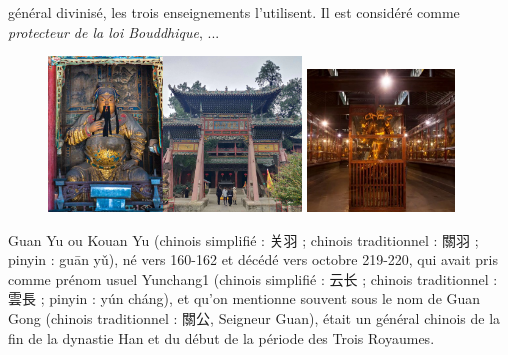 \begin{Ex}[Guan Yu ]
général divinisé, les trois enseignements l'utilisent. Il est considéré comme \textit{protecteur de la loi Bouddhique}, ...
        \begin{figure}[!h]
        \centering
                \includegraphics[width=0.6\textwidth]{ConfucianismeTaoismeBouddhismeChinois/Images/TempleGuanYu.png}
                \includegraphics[width=0.35\textwidth]{ConfucianismeTaoismeBouddhismeChinois/Images/StatueGuanYu.jpg}
        

        \label{fig:enter-label}
    \end{figure}
    Guan Yu ou Kouan Yu (chinois simplifié : 关羽 ; chinois traditionnel : 關羽 ; pinyin : guān yǔ), né vers 160-162 et décédé vers octobre 219-220, qui avait pris comme prénom usuel Yunchang1 (chinois simplifié : 云长 ; chinois traditionnel : 雲長 ; pinyin : yún cháng), et qu'on mentionne souvent sous le nom de Guan Gong (chinois traditionnel : 關公, Seigneur Guan), était un général chinois de la fin de la dynastie Han et du début de la période des Trois Royaumes.


\end{Ex}
